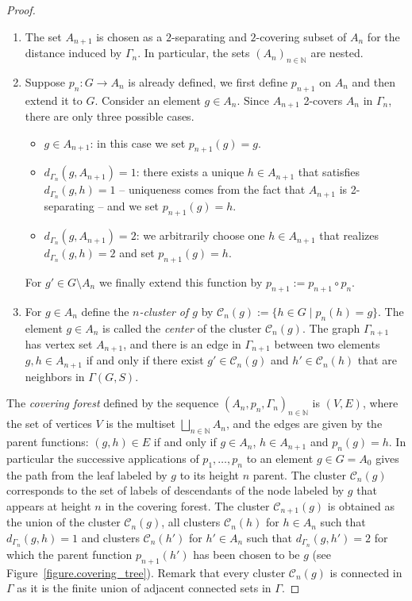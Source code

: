 \documentclass[letterpaper]{article}
\theoremstyle{plain}
\def\NN{\mathbb{N}}
\def\CC{\mathcal{C}}
\newcommand{\define}[1]{\emph{#1}}
\begin{document}
\begin{proof}
		\begin{enumerate}
			\item  The set $A_{n+1}$ is chosen as a $2$-separating and $2$-covering subset of $A_n$ for the distance induced by $\Gamma_n$. In particular, the sets $(A_n)_{n \in \NN}$ are nested.
			\item Suppose $p_n:G\to A_n$ is already defined, we first define $p_{n+1}$ on $A_{n}$ and then extend it to $G$. Consider an element $g\in A_n$. Since $A_{n+1}$ 2-covers $A_n$ in $\Gamma_n$, there are only three possible cases.
			\begin{itemize}
				\item $g\in A_{n+1}$: in this case we set $p_{n+1}(g)=g$.
				\item $d_{\Gamma_n}(g,A_{n+1})=1$: there exists a unique $h\in A_{n+1}$ that satisfies $d_{\Gamma_n}(g,h)=1$ -- uniqueness comes from the fact that $A_{n+1}$ is 2-separating -- and we set $p_{n+1}(g)=h$.
				\item $d_{\Gamma_n}(g,A_{n+1})=2$: we arbitrarily choose one $h\in A_{n+1}$ that realizes $d_{\Gamma_n}(g,h)=2$ and set $p_{n+1}(g)=h$.
			\end{itemize}
			For $g' \in G\setminus A_n$ we finally extend this function by $p_{n+1} := p_{n+1}\circ p_{n}$. 
			\item For $g \in A_n$ define the \define{$n$-cluster of $g$} by $\CC_n(g) := \{h \in G \mid p_{n}(h)=g \}$. The element $g\in A_n$ is called the \define{center} of the cluster $\CC_n(g)$. The graph $\Gamma_{n+1}$ has vertex set $A_{n+1}$, and there is an edge in $\Gamma_{n+1}$ between two elements $g,h \in A_{n+1}$ if and only if there exist $g'\in \CC_n(g)$ and $h'\in \CC_n(h)$ that are neighbors in $\Gamma(G,S)$.
		\end{enumerate}
		
		The \define{covering forest} defined by the sequence $(A_n,p_n,\Gamma_n)_{n \in \NN}$ is $(V,E)$, where the set of vertices  $V$ is the multiset $\bigsqcup_{n\in\NN} A_n$, and the edges are given by the parent functions: $(g,h)\in E$ if and only if $g\in A_n$, $h\in A_{n+1}$ and $p_n(g)=h$. In particular the successive applications of $p_1,\dots,p_n$ to an element $g\in G=A_0$ gives the path from the leaf labeled by $g$ to its height $n$ parent. The cluster $\CC_n(g)$ corresponds to the set of labels of descendants of the node labeled by $g$ that appears at height $n$ in the covering forest. The cluster $\CC_{n+1}(g)$ is obtained as the union of the cluster $\CC_n(g)$, all clusters $\CC_n(h)$ for $h\in A_n$ such that $d_{\Gamma_n}(g,h)=1$ and clusters $\CC_n(h')$ for $h'\in A_n$ such that $d_{\Gamma_n}(g,h')=2$ for which the parent function $p_{n+1}(h')$ has been chosen to be $g$ (see Figure~\ref{figure.covering_tree}). Remark that every cluster $\CC_n(g)$ is connected in $\Gamma$ as it is the finite union 
		of adjacent connected sets in $\Gamma$.
		

\end{proof}
\end{document}
